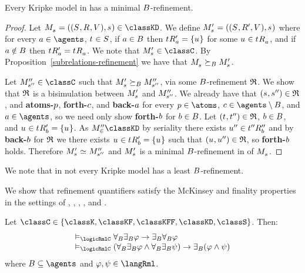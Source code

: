 \begin{proposition}\label{minimal-refinement-kd45}
Every Kripke model in \classKD{} has a minimal $B$-refinement.
\end{proposition}

\begin{proof}
Let $\kPModelAndTuple{\kStateS} \in \classKD$.
We define $\kPModelP{\kStateS} = ((\kStates, \kAccessibilityP{}, \kValuation), \kStateS)$ where for every $\agentA \in \agents$, $\kStateT \in \kStates$, if $a \in B$ then $\kSuccessorsPA{\kStateT} = \{\kStateU\}$ for some $\kStateU \in \kSuccessorsA{\kStateT}$, and if $a \notin B$ then $\kSuccessorsPA{\kStateT} = \kSuccessorsA{\kStateT}$.
We note that $\kPModelP{\kStateS} \in \classC$.
By Proposition~\ref{subrelations-refinement} we have that $\kPModel{\kStateS} \simulatesBs \kPModelP{\kStateS}$.

Let $\kPModelPP{\kStateSPP} \in \classC$ such that $\kPModelP{\kStateS} \simulatesBs \kPModelPP{\kStateSPP}$, via some $B$-refinement $\mathfrak{R}$.
We show that $\mathfrak{R}$ is a bisimulation between $\kPModelP{\kStateS}$ and ${M^{\prime\prime}_{{s}^{\prime\prime}}}$.
We already have that $(\kStateS, \kStateSPP) \in \refinement$, and {\bf atoms-$p$}, {\bf forth-$c$}, and {\bf back-$a$} for every $\atomP \in \atoms$, $\agentC \in \agents \setminus \agentsB$, and $\agentA \in \agents$, so we need only show {\bf forth-$b$} for $b \in B$.
Let $(\kStateT, \kStateTPP) \in \refinement$, $b \in B$, and $\kStateU \in \kSuccessorsPB{\kStateT} = \{\kStateU\}$.
As $\kPModelPP \in \classKD$ by seriality there exists ${u}^{\prime\prime} \in {{t}^{\prime\prime}} {R^{\prime\prime}_{b}}$ and by {\bf back-$b$} for $\mathfrak{R}$ we there exists $\kStateU \in \kSuccessorsPB{\kStateT} = \{\kStateU\}$ such that $(\kStateU, \kStateUPP) \in \refinement$, so {\bf forth-$b$} holds.
Therefore $\kPModelP{\kStateS} \bisimilar \kPModelPP{\kStateSPP}$ and $\kPModelP{\kStateS}$ is a minimal $B$-refinement in \classC{} of $\kPModel{\kStateS}$.
\end{proof}

We note that in \classKD{} not every Kripke model has a least $B$-refinement.

We show that refinement quantifiers satisfy the McKinsey and finality properties in the settings of \classK{}, \classKF{}, \classKFF{}, \classKD{}, and \classS{}.

\begin{proposition}\label{rml-mckinsey}
Let $\classC \in \{\classK, \classKF, \classKFF, \classKD, \classS\}$. Then:
$$
\begin{array}{l}
    \entails_\logicRmlC \allrefsBs \somerefsBs \phi \implies \somerefsBs \allrefsBs \phi\\
    \entails_\logicRmlC (\allrefsBs \somerefsBs \phi \land \allrefsBs \somerefsBs \psi) \implies \somerefsBs (\phi \land \psi)
\end{array}
$$
where $\agentsB \subseteq \agents$ and $\phi, \psi \in \langRml$.
\end{proposition}

